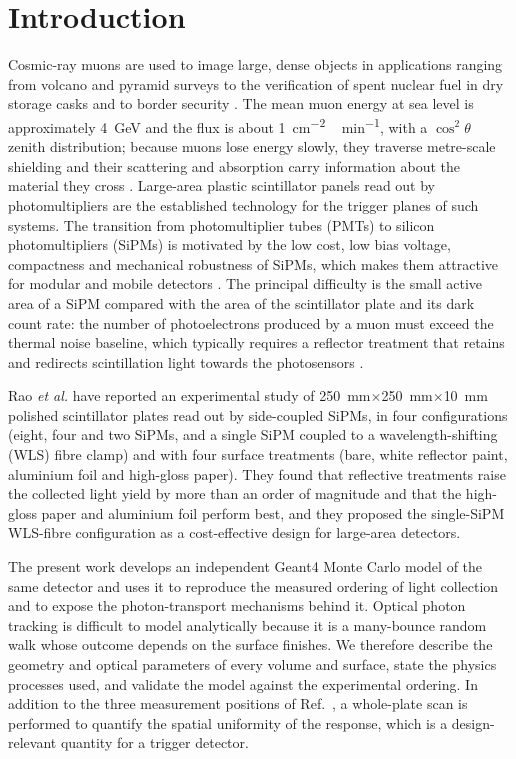 \documentclass[3p]{elsarticle}
\newcommand{\gfour}{Geant4}
\newcommand{\sipm}{SiPM}
\begin{document}
\section{Introduction}
\label{sec:intro}

Cosmic-ray muons are used to image large, dense objects in applications
ranging from volcano and pyramid surveys to the verification of spent nuclear
fuel in dry storage casks and to border security
\cite{Borozdin2003,Bonechi2020}. The mean muon energy at sea level is
approximately \SI{4}{\giga\electronvolt} and the flux is about
\SI{1}{cm^{-2}\,min^{-1}}, with a $\cos^2\theta$ zenith distribution; because
muons lose energy slowly, they traverse metre-scale shielding and their
scattering and absorption carry information about the material they cross
\cite{Rao2025}. Large-area plastic scintillator panels read out by
photomultipliers are the established technology for the trigger planes of such
systems. The transition from photomultiplier tubes (PMTs) to silicon
photomultipliers (\sipm{}s) is motivated by the low cost, low bias voltage,
compactness and mechanical robustness of \sipm{}s, which makes them attractive
for modular and mobile detectors \cite{Gundacker2020}. The principal
difficulty is the small active area of a \sipm{} compared with the area of the
scintillator plate and its dark count rate: the number of photoelectrons
produced by a muon must exceed the thermal noise baseline, which typically
requires a reflector treatment that retains and redirects scintillation light
towards the photosensors \cite{Rao2025}.

Rao \emph{et al.} \cite{Rao2025} have reported an experimental study of
\SI{250}{\milli\meter}$\times$\SI{250}{\milli\meter}$\times$\SI{10}{\milli\meter}
polished scintillator plates read out by side-coupled \sipm{}s, in four
configurations (eight, four and two \sipm{}s, and a single \sipm{} coupled to a
wavelength-shifting (WLS) fibre clamp) and with four surface treatments (bare,
white reflector paint, aluminium foil and high-gloss paper). They found that
reflective treatments raise the collected light yield by more than an order of
magnitude and that the high-gloss paper and aluminium foil perform best, and
they proposed the single-\sipm{} WLS-fibre configuration as a cost-effective
design for large-area detectors.

The present work develops an independent \gfour{} Monte Carlo model of the
same detector and uses it to reproduce the measured ordering of light
collection and to expose the photon-transport mechanisms behind it. Optical
photon tracking is difficult to model analytically because it is a many-bounce
random walk whose outcome depends on the surface finishes. We therefore
describe the geometry and optical parameters of every volume and surface, state
the physics processes used, and validate the model against the experimental
ordering. In addition to the three measurement positions of
Ref.~\cite{Rao2025}, a whole-plate scan is performed to quantify the spatial
uniformity of the response, which is a design-relevant quantity for a trigger
detector.
\end{document}
